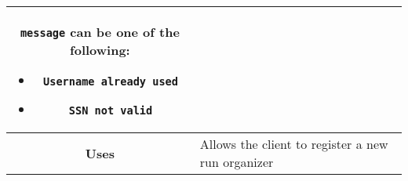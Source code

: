 \begin{adjustwidth}{1cm}{}
\begin{longtable}{|c|l|}
\begin{minipage}[t]{0.7\textwidth}
\begin{adjustwidth}{1.5cm}{}
                \end{adjustwidth}
                \texttt{message} can be one of the following: 
                \begin{itemize}
                    \item \texttt{Username already used}
                    \item \texttt{SSN not valid}
                \end{itemize}
              \end{minipage} \\
              \hline
            \textbf{Uses} & Allows the client to register a new run organizer \\
            \hline
        \end{longtable}
    \end{adjustwidth}

